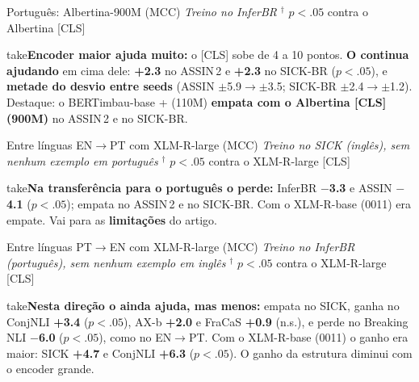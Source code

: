 \documentclass[aspectratio=169,10pt]{beamer}
\newcommand{\up}[1]{\textcolor{logic}{\textbf{#1}}}
\newcommand{\down}[1]{\textcolor{relneg}{\textbf{#1}}}
\newcommand{\take}[1]{\vspace{4pt}\begin{beamercolorbox}[sep=5pt,rounded=true]{take}\small #1\end{beamercolorbox}}
\newcommand{\tab}[2][1]{\resizebox{#1\linewidth}{!}{}}
\begin{document}
\begin{frame}{Português: Albertina-900M (MCC)}
\textit{\small Treino no InferBR} \hfill {\scriptsize $^\dagger$ $p<.05$ contra o Albertina [CLS]}\\[3pt]
\centering\tab[0.85]{pt_large}
\take{\textbf{Encoder maior ajuda muito:} o [CLS] sobe de 4 a 10 pontos. \textbf{O \model{} continua ajudando} em cima dele: \up{+2.3} no ASSIN\,2 e \up{+2.3} no SICK-BR ($p<.05$), e \textbf{metade do desvio entre seeds} (ASSIN $\pm$5.9$\to\pm$3.5; SICK-BR $\pm$2.4$\to\pm$1.2). Destaque: o BERTimbau-base + \model{} (110M) \textbf{empata com o Albertina [CLS] (900M)} no ASSIN\,2 e no SICK-BR.}
\end{frame}


\begin{frame}{Entre línguas EN$\to$PT com XLM-R-large (MCC)}
\textit{\small Treino no SICK (inglês), sem nenhum exemplo em português} \hfill {\scriptsize $^\dagger$ $p<.05$ contra o XLM-R-large [CLS]}\\[3pt]
\centering\tab[0.85]{xl_large_pt}
\take{\textbf{Na transferência para o português o \model{} perde:} InferBR \down{$-$3.3} e ASSIN \down{$-$4.1} ($p<.05$); empata no ASSIN\,2 e no SICK-BR. Com o XLM-R-base (0011) era empate. Vai para as \textbf{limitações} do artigo.}
\end{frame}

\begin{frame}{Entre línguas PT$\to$EN com XLM-R-large (MCC)}
\textit{\small Treino no InferBR (português), sem nenhum exemplo em inglês} \hfill {\scriptsize $^\dagger$ $p<.05$ contra o XLM-R-large [CLS]}\\[3pt]
\centering\tab[0.85]{xl_large_pt_to_en}
\take{\textbf{Nesta direção o \model{} ainda ajuda, mas menos:} empata no SICK, ganha no ConjNLI \up{+3.4} ($p<.05$), AX-b \up{+2.0} e FraCaS \up{+0.9} (n.s.), e perde no Breaking NLI \down{$-$6.0} ($p<.05$), como no EN$\to$PT. Com o XLM-R-base (0011) o ganho era maior: SICK \up{+4.7} e ConjNLI \up{+6.3} ($p<.05$). O ganho da estrutura diminui com o encoder grande.}
\end{frame}
\end{document}
